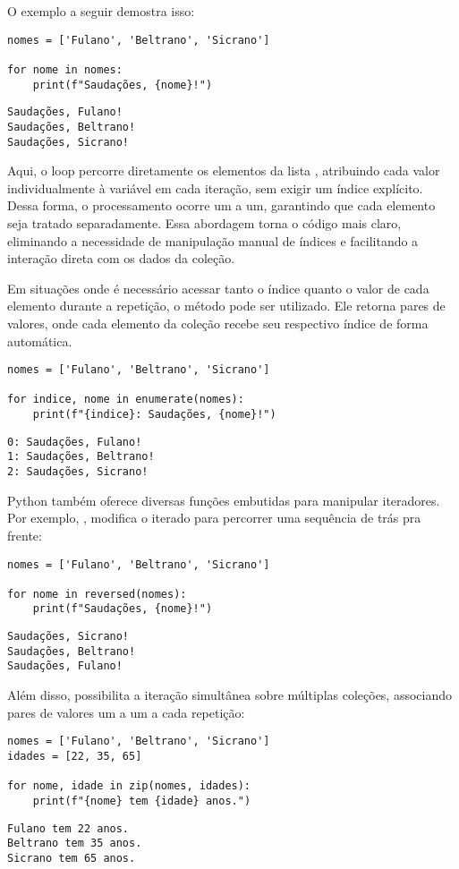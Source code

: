 O exemplo a seguir demostra isso:
\begin{verbatim}
nomes = ['Fulano', 'Beltrano', 'Sicrano']

for nome in nomes:
    print(f"Saudações, {nome}!")
\end{verbatim}
\begin{verbatim}
Saudações, Fulano!
Saudações, Beltrano!
Saudações, Sicrano!
\end{verbatim}



Aqui, o loop percorre diretamente os elementos da lista , atribuindo cada valor individualmente
à variável  em cada iteração, sem exigir um índice explícito.
Dessa forma, o processamento ocorre um a um, garantindo que cada elemento seja tratado separadamente.
Essa abordagem torna o código mais claro, eliminando a necessidade de manipulação manual de índices e
facilitando a interação direta com os dados da coleção.

Em situações onde é necessário acessar tanto o índice quanto o valor de cada elemento durante a repetição, o método  pode ser utilizado. Ele retorna pares de valores, onde cada elemento da coleção recebe seu respectivo índice de forma automática.
\begin{verbatim}
nomes = ['Fulano', 'Beltrano', 'Sicrano']

for indice, nome in enumerate(nomes):
    print(f"{indice}: Saudações, {nome}!")
\end{verbatim}
\begin{verbatim}
0: Saudações, Fulano!
1: Saudações, Beltrano!
2: Saudações, Sicrano!
\end{verbatim}

Python também oferece diversas funções embutidas para manipular iteradores.
Por exemplo, ,
modifica o iterado para percorrer uma sequência de trás pra frente:
\begin{verbatim}
nomes = ['Fulano', 'Beltrano', 'Sicrano']

for nome in reversed(nomes):
    print(f"Saudações, {nome}!")
\end{verbatim}
\begin{verbatim}
Saudações, Sicrano!
Saudações, Beltrano!
Saudações, Fulano!
\end{verbatim}

Além disso,  possibilita a iteração simultânea sobre múltiplas coleções, associando pares de valores
um a um a cada repetição:
\begin{verbatim}
nomes = ['Fulano', 'Beltrano', 'Sicrano']
idades = [22, 35, 65]

for nome, idade in zip(nomes, idades):
    print(f"{nome} tem {idade} anos.")
\end{verbatim}
\begin{verbatim}
Fulano tem 22 anos.
Beltrano tem 35 anos.
Sicrano tem 65 anos.
\end{verbatim}

